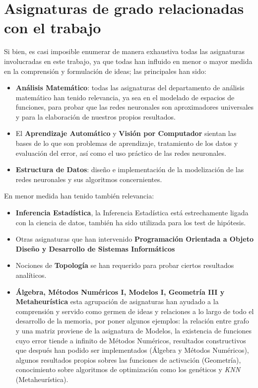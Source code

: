 
\section{Asignaturas de grado relacionadas con el trabajo }  

Si bien, es casi imposible enumerar de manera
exhaustiva todas las asignaturas involucradas en este trabajo,
ya que todas han influido en menor o mayor medida en la comprensión 
y formulación de ideas; las principales han
sido: 
\begin{itemize}
    \item \textbf{Análisis Matemático}: todas las asignaturas del departamento de análisis matemático
    han tenido relevancia, ya sea en el modelado de espacios de funciones,
    para probar que las redes neuronales son aproximadores universales
    y para la elaboración de nuestros propios resultados.  
    \item El \textbf{Aprendizaje Automático} y \textbf{Visión por Computador} sientan las bases de lo que son problemas de aprendizaje, 
    tratamiento de los datos y evaluación del error, así como el uso práctico de las redes neuronales. 
    \item \textbf{Estructura de Datos}: diseño e implementación de la modelización de las redes neuronales y 
    sus algoritmos concernientes. 
\end{itemize}

En menor medida han tenido también relevancia: 
\begin{itemize}
    \item \textbf{Inferencia Estadística}, la Inferencia Estadística está estrechamente ligada con 
    la ciencia de datos, también ha sido utilizada para los test de hipótesis. 
    \item Otras asignaturas que han intervenido \textbf{Programación Orientada a Objeto} \textbf{Diseño y Desarrollo de Sistemas Informáticos}
    \item Nociones de \textbf{Topología} se han requerido para probar ciertos resultados analíticos. 
    \item \textbf{Álgebra, Métodos Numéricos I, Modelos I, Geometría III y Metaheurística} esta agrupación de asignaturas 
    han ayudado a la comprensión  y servido como germen de ideas y relaciones a lo largo de todo el desarrollo de la memoria, 
    por poner algunos ejemplos: la relación entre grafo y una matriz proviene de la asignatura de Modelos, 
    la existencia de funciones cuyo error tiende a infinito de Métodos Numéricos,
    resultados constructivos  que después han podido ser implementados (Álgebra y Métodos Numéricos), algunos resultados propios sobres las funciones de activación (Geometría), 
    conocimiento sobre algoritmos de optimización como los genéticos y \textit{KNN} (Metaheurística).
\end{itemize}